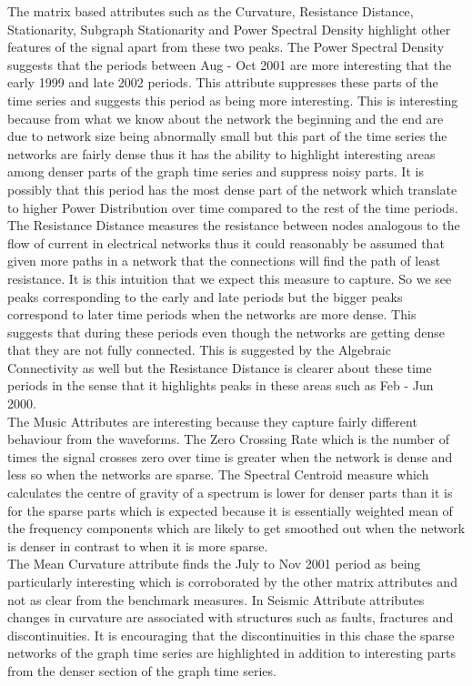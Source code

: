 The matrix based attributes such as the Curvature, Resistance Distance, Stationarity, Subgraph Stationarity and Power Spectral Density highlight other features of the signal apart from these two peaks. The Power Spectral Density suggests that the periods between Aug - Oct 2001 are more interesting that the early 1999 and late 2002 periods. This attribute suppresses these parts of the time series and suggests this period as being more interesting. This is interesting because from what we know about the network the beginning and the end are due to network size being abnormally small but this part of the time series the networks are fairly dense thus it has the ability to highlight interesting areas among denser parts of the graph time series and suppress noisy parts. It is possibly that this period has the most dense part of the network which translate to higher Power Distribution over time compared to the rest of the time periods. \\

The Resistance Distance measures the resistance between nodes analogous to the flow of current in electrical networks thus it could reasonably be assumed that given more paths in a network that the connections will find the path of least resistance. It is this intuition that we expect this measure to capture. So we see peaks corresponding to the early and late periods but the bigger peaks correspond to later time periods when the networks are more dense. This suggests that during these periods even though the networks are getting dense that they are not fully connected. This is suggested by the Algebraic Connectivity as well but the Resistance Distance is clearer about these time periods in the sense that it highlights  peaks in these areas such as Feb - Jun 2000. \\ 

The Music Attributes are interesting because they capture fairly different behaviour from the waveforms. The Zero Crossing Rate which is the number of times the signal crosses zero over time is greater when the network is dense and less so when the networks are sparse. The Spectral Centroid measure which calculates the centre of gravity of a spectrum is lower for denser parts than it is for the sparse parts which is expected because it is essentially weighted mean of the frequency components which are likely to get smoothed out when the network is denser in contrast to when it is more sparse. \\

The Mean Curvature attribute finds the July to Nov 2001 period as being particularly interesting which is corroborated by the other matrix attributes and not as clear from the benchmark measures. In Seismic Attribute attributes changes in curvature are associated with structures such as faults, fractures and discontinuities. It is encouraging that the discontinuities in this chase the sparse networks of the graph time series are highlighted in addition to interesting parts from the denser section of the graph time series. \\

